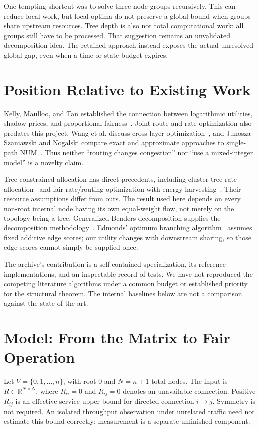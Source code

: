 \documentclass[conference,letterpaper]{IEEEtran}
\begin{document}
One tempting shortcut was to solve three-node groups recursively. This can reduce local work, but local optima do not preserve a global bound when groups share upstream resources. Tree depth is also not total computational work: all groups still have to be processed. That suggestion remains an unvalidated decomposition idea. The retained approach instead exposes the actual unresolved global gap, even when a time or state budget expires.

\section{Position Relative to Existing Work}
Kelly, Maulloo, and Tan established the connection between logarithmic utilities, shadow prices, and proportional fairness~\cite{kelly}. Joint route and rate optimization also predates this project: Wang et al. discuss cross-layer optimization~\cite{wang}, and Junosza-Szaniawski and Nogalski compare exact and approximate approaches to single-path NUM~\cite{junosza}. Thus neither ``routing changes congestion'' nor ``use a mixed-integer model'' is a novelty claim.

Tree-constrained allocation has direct precedents, including cluster-tree rate allocation~\cite{morell} and fair rate/routing optimization with energy harvesting~\cite{marasevic}. Their resource assumptions differ from ours. The result used here depends on every non-root internal node having its own equal-weight flow, not merely on the topology being a tree. Generalized Benders decomposition supplies the decomposition methodology~\cite{geoffrion}. Edmonds' optimum branching algorithm~\cite{edmonds} assumes fixed additive edge scores; our utility changes with downstream sharing, so those edge scores cannot simply be supplied once.

The archive's contribution is a self-contained specialization, its reference implementations, and an inspectable record of tests. We have not reproduced the competing literature algorithms under a common budget or established priority for the structural theorem. The internal baselines below are not a comparison against the state of the art.

\section{Model: From the Matrix to Fair Operation}
Let $V=\{0,1,\ldots,n\}$, with root $0$ and $N=n+1$ total nodes. The input is $R\in\mathbb R_+^{N\times N}$, where $R_{ii}=0$ and $R_{ij}=0$ denotes an unavailable connection. Positive $R_{ij}$ is an effective service upper bound for directed connection $i\to j$. Symmetry is not required. An isolated throughput observation under unrelated traffic need not estimate this bound correctly; measurement is a separate unfinished component.
\end{document}
